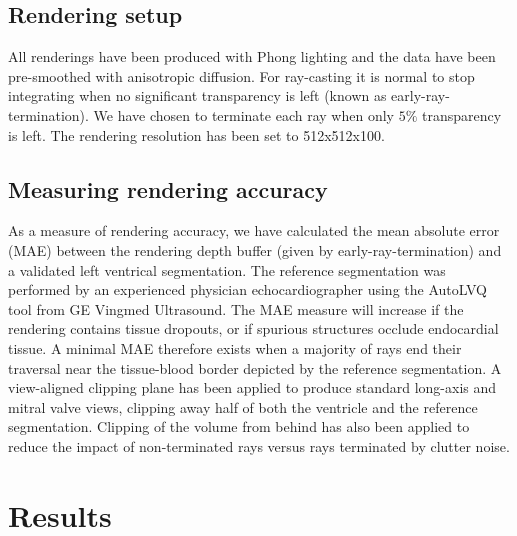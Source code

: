\subsection{Rendering setup}
All renderings have been produced with Phong lighting and the data have been pre-smoothed with anisotropic diffusion\cite{perona1990scale, Steen}. %
For ray-casting it is normal to stop integrating when no significant transparency is left (known as early-ray-termination). We have chosen to terminate each ray when only $5 \%$ transparency is left. The rendering resolution has been set to 512x512x100.

\subsection{Measuring rendering accuracy}
As a measure of rendering accuracy, we have calculated the mean absolute error (MAE) between the rendering depth buffer (given by early-ray-termination) and a validated left ventrical segmentation. The reference segmentation was performed by an experienced physician echocardiographer using the AutoLVQ tool from GE Vingmed Ultrasound. The MAE measure will increase if the rendering contains tissue dropouts, or if spurious structures occlude endocardial tissue. A minimal MAE therefore exists when a majority of rays end their traversal near the tissue-blood border depicted by the reference segmentation. A view-aligned clipping plane has been applied to produce standard long-axis and mitral valve views, clipping away half of both the ventricle and the reference segmentation. Clipping of the volume from behind has also been applied to reduce the impact of non-terminated rays versus rays terminated by clutter noise.

\section{Results}\label{sec:res}


